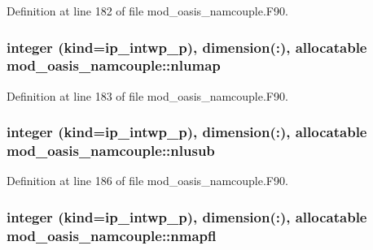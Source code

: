 Definition at line 182 of file mod\+\_\+oasis\+\_\+namcouple.\+F90.

\hypertarget{classmod__oasis__namcouple_a42367b4984c6ac4c69cbdcd315cb54e6}{
\subsubsection[{nlumap}]{\setlength{\rightskip}{0pt plus 5cm}integer (kind=ip\+\_\+intwp\+\_\+p), dimension(\+:), allocatable mod\+\_\+oasis\+\_\+namcouple\+::nlumap\hspace{0.3cm}{\ttfamily [private]}}}\label{classmod__oasis__namcouple_a42367b4984c6ac4c69cbdcd315cb54e6}


Definition at line 183 of file mod\+\_\+oasis\+\_\+namcouple.\+F90.

\hypertarget{classmod__oasis__namcouple_aefed5eaa9924d249e979a5a772a46979}{
\subsubsection[{nlusub}]{\setlength{\rightskip}{0pt plus 5cm}integer (kind=ip\+\_\+intwp\+\_\+p), dimension(\+:), allocatable mod\+\_\+oasis\+\_\+namcouple\+::nlusub\hspace{0.3cm}{\ttfamily [private]}}}\label{classmod__oasis__namcouple_aefed5eaa9924d249e979a5a772a46979}


Definition at line 186 of file mod\+\_\+oasis\+\_\+namcouple.\+F90.

\hypertarget{classmod__oasis__namcouple_ac623e3e0906f57983efc1ab912ce9674}{
\subsubsection[{nmapfl}]{\setlength{\rightskip}{0pt plus 5cm}integer (kind=ip\+\_\+intwp\+\_\+p), dimension(\+:), allocatable mod\+\_\+oasis\+\_\+namcouple\+::nmapfl\hspace{0.3cm}{\ttfamily [private]}}}\label{classmod__oasis__namcouple_ac623e3e0906f57983efc1ab912ce9674}


